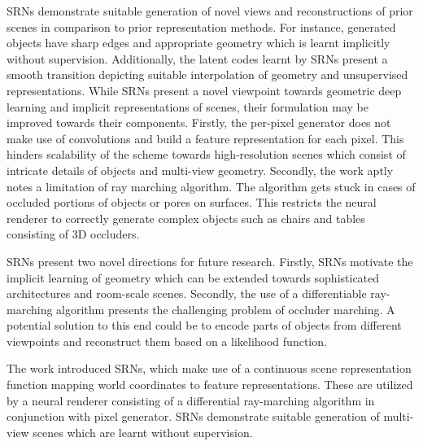 \documentclass[11pt,letterpaper]{article}
\begin{document}
SRNs demonstrate suitable generation of novel views and reconstructions of prior scenes in comparison to prior representation methods. For instance, generated objects have sharp edges and appropriate geometry which is learnt implicitly without supervision. Additionally, the latent codes learnt by SRNs present a smooth transition depicting suitable interpolation of geometry and unsupervised representations. While SRNs present a novel viewpoint towards geometric deep learning and implicit representations of scenes, their formulation may be improved towards their components. Firstly, the per-pixel generator does not make use of convolutions and build a feature representation for each pixel. This hinders scalability of the scheme towards high-resolution scenes which consist of intricate details of objects and multi-view geometry. Secondly, the work aptly notes a limitation of ray marching algorithm. The algorithm gets stuck in cases of occluded portions of objects or pores on surfaces. This restricts the neural renderer to correctly generate complex objects such as chairs and tables consisting of 3D occluders. 

SRNs present two novel directions for future research. Firstly, SRNs motivate the implicit learning of geometry which can be extended towards sophisticated architectures and room-scale scenes. Secondly, the use of a differentiable ray-marching algorithm presents the challenging problem of occluder marching. A potential solution to this end could be to encode parts of objects from different viewpoints and reconstruct them based on a likelihood function. 

The work introduced SRNs, which make use of a continuous scene representation function mapping world coordinates to feature representations. These are utilized by a neural renderer consisting of a differential ray-marching algorithm in conjunction with pixel generator. SRNs demonstrate suitable generation of multi-view scenes which are learnt without supervision. 
\end{document}
